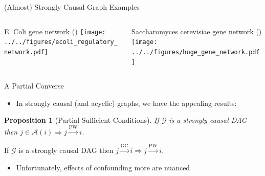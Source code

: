\documentclass{beamer} %
\newtheorem*{proposition}{Proposition}
\def\gc{\overset{\text{GC}}{\rightarrow}}  %
\def\pwgc{\overset{\text{PW}}{\rightarrow}}  %
\def\npwgc{\overset{\text{PW}}{\nrightarrow}}  %
\def\gcg{\mathcal{G}}  %
\newcommand{\anc}[1]{\mathcal{A}(#1)}  %
\begin{document}
\begin{frame}{(Almost) Strongly Causal Graph Examples}
  \begin{columns}
    \begin{column}{0.5\linewidth}
      \small{E. Coli gene network \tiny{()}}
      \texttt{[image: ../../figures/ecoli\_regulatory\_network.pdf]}\pause
    \end{column}
    \begin{column}{0.5\linewidth}
      \small{Saccharomyces cerevisiae gene network \tiny{()}}
      \texttt{[image: ../../figures/huge\_gene\_network.pdf]}\pause
    \end{column}
  \end{columns}
\end{frame}

\begin{frame}{A Partial Converse}
  \begin{itemize}
    \item{In strongly causal (and acyclic) graphs, we have the appealing results:}
  \end{itemize}

  \begin{proposition}[Partial Sufficient Conditions]
    \label{prop:pwgc_anc}
    If $\gcg$ is a strongly causal DAG then $j \in \anc{i} \Rightarrow j \pwgc i$.
  \end{proposition}\pause

  \begin{corollary}
    \label{cor:gc_implies_pwgc}
    If $\gcg$ is a strongly causal DAG then $j \gc i \Rightarrow j \pwgc i$.
  \end{corollary}\pause

  \begin{itemize}
    \item{Unfortunately, effects of confounding more are nuanced}\pause
  \end{itemize}
\end{frame}

\end{document}
